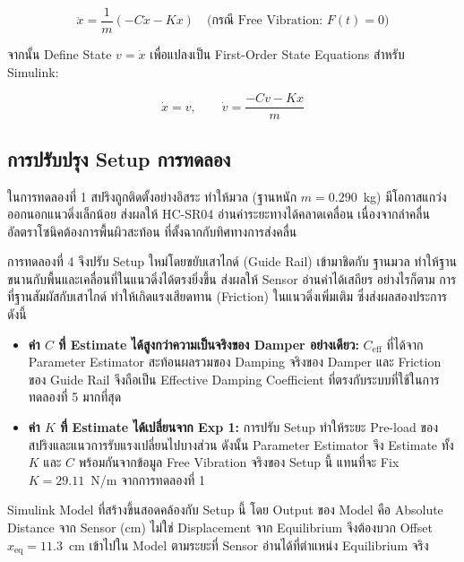 \begin{equation}
    \ddot{x} = \frac{1}{m}\!\left(-C\dot{x} - Kx\right)
    \quad \text{(กรณี Free Vibration: }F(t) = 0\text{)}
    \label{eq:simulink_accel}
\end{equation}

จากนั้น Define State $v = \dot{x}$ เพื่อแปลงเป็น First-Order
State Equations สำหรับ Simulink:

\begin{equation}
    \dot{x} = v, \qquad
    \dot{v} = \frac{-Cv - Kx}{m}
    \label{eq:simulink_state}
\end{equation}

\subsection{การปรับปรุง Setup การทดลอง}
 
ในการทดลองที่ 1 สปริงถูกติดตั้งอย่างอิสระ ทำให้มวล (ฐานหนัก $m = 0.290$~kg)
มีโอกาสแกว่งออกนอกแนวดิ่งเล็กน้อย ส่งผลให้ HC-SR04
อ่านค่าระยะทางได้คลาดเคลื่อน เนื่องจากลำคลื่นอัลตราโซนิคต้องการพื้นผิวสะท้อน
ที่ตั้งฉากกับทิศทางการส่งคลื่น
 
การทดลองที่ 4 จึงปรับ Setup ใหม่โดยขยับเสาไกด์ (Guide Rail) เข้ามาชิดกับ
ฐานมวล ทำให้ฐานขนานกับพื้นและเคลื่อนที่ในแนวดิ่งได้ตรงยิ่งขึ้น
ส่งผลให้ Sensor อ่านค่าได้เสถียร อย่างไรก็ตาม การที่ฐานสัมผัสกับเสาไกด์
ทำให้เกิดแรงเสียดทาน (Friction) ในแนวดิ่งเพิ่มเติม ซึ่งส่งผลสองประการดังนี้
 
\begin{itemize}
    \item \textbf{ค่า $C$ ที่ Estimate ได้สูงกว่าความเป็นจริงของ Damper อย่างเดียว:}
          $C_\text{eff}$ ที่ได้จาก Parameter Estimator สะท้อนผลรวมของ
          Damping จริงของ Damper และ Friction ของ Guide Rail
          จึงถือเป็น Effective Damping Coefficient
          ที่ตรงกับระบบที่ใช้ในการทดลองที่ 5 มากที่สุด
 
    \item \textbf{ค่า $K$ ที่ Estimate ได้เปลี่ยนจาก Exp 1:}
          การปรับ Setup ทำให้ระยะ Pre-load ของสปริงและแนวการรับแรงเปลี่ยนไปบางส่วน
          ดังนั้น Parameter Estimator จึง Estimate ทั้ง $K$ และ $C$
          พร้อมกันจากข้อมูล Free Vibration จริงของ Setup นี้
          แทนที่จะ Fix $K = 29.11$~N/m จากการทดลองที่ 1
\end{itemize}
 
Simulink Model ที่สร้างขึ้นสอดคล้องกับ Setup นี้ โดย Output ของ Model
คือ Absolute Distance จาก Sensor (cm) ไม่ใช่ Displacement จาก Equilibrium
จึงต้องบวก Offset $x_\text{eq} = 11.3$~cm เข้าไปใน Model
ตามระยะที่ Sensor อ่านได้ที่ตำแหน่ง Equilibrium จริง

